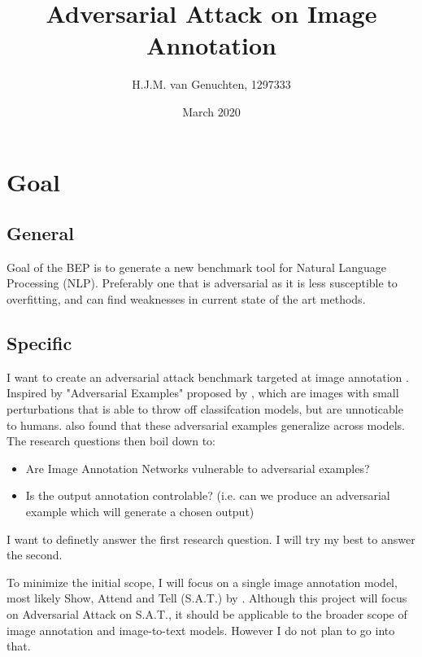 \documentclass[12pt]{extarticle}
\title{Adversarial Attack on Image Annotation}
\author{H.J.M. van Genuchten, 1297333}
\date{March 2020}
\begin{document}
\maketitle

\section{ Goal}
\subsection{General}
Goal of the BEP is to generate a new benchmark tool for Natural Language Processing (NLP). Preferably one that is adversarial as it is less susceptible to overfitting, and can find weaknesses in current state of the art methods.

\subsection{Specific}
I want to create an adversarial attack benchmark targeted at image annotation \cite{venkatesh,xu2016show}. Inspired by "Adversarial Examples" proposed by \citeauthor{szegedy2014intriguing}, which are images with small perturbations that is able to throw off classifcation models, but are unnoticable to humans. \citeauthor{szegedy2014intriguing} also found that these adversarial examples generalize across models. The research questions then boil down to:
\begin{itemize}
    \item Are Image Annotation Networks vulnerable to adversarial examples?
    \item Is the output annotation controlable? (i.e. can we produce an adversarial example which will generate a chosen output)
\end{itemize}


I want to definetly answer the first research question. I will try my best to answer the second.

To minimize the initial scope, I will focus on a single image annotation model, most likely Show, Attend and Tell (S.A.T.) by \citeauthor{xu2016show}. Although this project will focus on Adversarial Attack on S.A.T., it should be applicable to the broader scope of image annotation and image-to-text models. However I do not plan to go into that.
\end{document}
